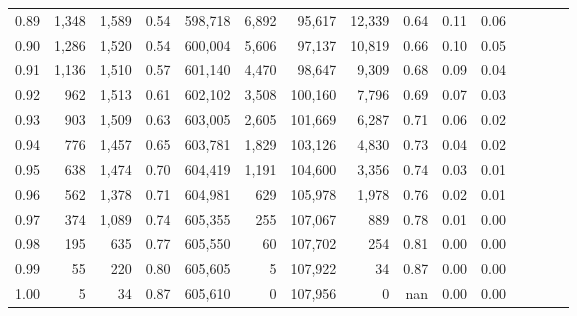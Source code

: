 \begin{tabular}{rrrcrrrrrrrrrrr}
0.89 &  1,348 &  1,589 &                                       0.54 &  598,718 &    6,892 &   95,617 &   12,339 &  0.64 &  0.11 &                         0.06 \\
0.90 &  1,286 &  1,520 &                                       0.54 &  600,004 &    5,606 &   97,137 &   10,819 &  0.66 &  0.10 &                         0.05 \\
0.91 &  1,136 &  1,510 &                                       0.57 &  601,140 &    4,470 &   98,647 &    9,309 &  0.68 &  0.09 &                         0.04 \\
0.92 &    962 &  1,513 &                                       0.61 &  602,102 &    3,508 &  100,160 &    7,796 &  0.69 &  0.07 &                         0.03 \\
0.93 &    903 &  1,509 &                                       0.63 &  603,005 &    2,605 &  101,669 &    6,287 &  0.71 &  0.06 &                         0.02 \\
0.94 &    776 &  1,457 &                                       0.65 &  603,781 &    1,829 &  103,126 &    4,830 &  0.73 &  0.04 &                         0.02 \\
0.95 &    638 &  1,474 &                                       0.70 &  604,419 &    1,191 &  104,600 &    3,356 &  0.74 &  0.03 &                         0.01 \\
0.96 &    562 &  1,378 &                                       0.71 &  604,981 &      629 &  105,978 &    1,978 &  0.76 &  0.02 &                         0.01 \\
0.97 &    374 &  1,089 &                                       0.74 &  605,355 &      255 &  107,067 &      889 &  0.78 &  0.01 &                         0.00 \\
0.98 &    195 &    635 &                                       0.77 &  605,550 &       60 &  107,702 &      254 &  0.81 &  0.00 &                         0.00 \\
0.99 &     55 &    220 &                                       0.80 &  605,605 &        5 &  107,922 &       34 &  0.87 &  0.00 &                         0.00 \\
1.00 &      5 &     34 &                                       0.87 &  605,610 &        0 &  107,956 &        0 &   nan &  0.00 &                         0.00 \\
\bottomrule
\end{tabular}
